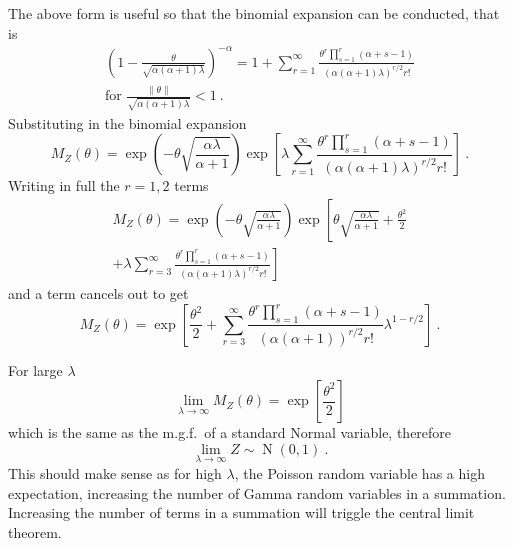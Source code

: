 \documentclass[12pt, a4paper]{memoir}
\DeclareMathOperator{\normal}{N}
\begin{document}
The above form is useful so that the binomial expansion can be conducted, that is
\begin{multline}
\left(
1-\frac{\theta}{\sqrt{\alpha(\alpha+1)\lambda}}
\right)^{-\alpha}
=
1+
\sum_{r=1}^\infty \frac{\theta^r\prod_{s=1}^r(\alpha+s-1)}{(\alpha(\alpha+1)\lambda)^{r/2}r!}
\\
\text{for }\frac{\|\theta\|}{\sqrt{\alpha(\alpha+1)\lambda}}<1 \ .
\end{multline}
Substituting in the binomial expansion
\begin{equation*}
M_Z(\theta)=\exp\left(-\theta\sqrt{\frac{\alpha\lambda}{\alpha+1}}\right)
\exp\left[
\lambda
\sum_{r=1}^\infty \frac{\theta^r\prod_{s=1}^r(\alpha+s-1)}{(\alpha(\alpha+1)\lambda)^{r/2}r!}
\right] \ .
\end{equation*}
Writing in full the $r=1,2$ terms
\begin{multline*}
M_Z(\theta)=\exp\left(-\theta\sqrt{\frac{\alpha\lambda}{\alpha+1}}\right)
\exp\left[
\theta\sqrt{\frac{\alpha\lambda}{\alpha+1}}
+\frac{\theta^2}{2}
\right.\\\left.
+\lambda\sum_{r=3}^\infty \frac{\theta^r\prod_{s=1}^r(\alpha+s-1)}{(\alpha(\alpha+1)\lambda)^{r/2}r!}
\right]
\end{multline*}
and a term cancels out to get
\begin{equation}
M_Z(\theta)=
\exp\left[
	\frac{\theta^2}{2}
	+\sum_{r=3}^\infty
		\frac{\theta^r
			\prod_{s=1}^r(\alpha+s-1)
		}
		{(\alpha(\alpha+1))^{r/2}r!}
		\lambda^{1-r/2}
\right] \ .
\end{equation}

For large $\lambda$
\begin{equation}
\lim_{\lambda\rightarrow\infty}M_Z(\theta)=\exp\left[\frac{\theta^2}{2}\right]
\end{equation}
which is the same as the m.g.f.~of a standard Normal variable, therefore
\begin{equation}
\lim_{\lambda\rightarrow\infty}Z\sim\normal(0,1) \ .
\end{equation}
This should make sense as for high $\lambda$, the Poisson random variable has a high expectation, increasing the number of Gamma random variables in a summation. Increasing the number of terms in a summation will triggle the central limit theorem.
\end{document}
